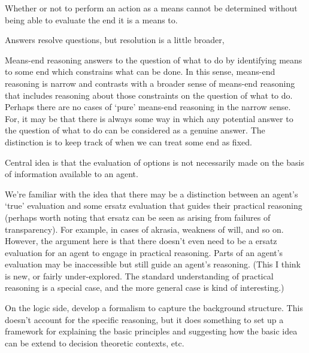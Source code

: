 \documentclass[10pt]{article}
\begin{document}
\begin{principle}
  Whether or not to perform an action as a means cannot be determined without being able to evaluate the end it is a means to.
\end{principle}

Answers resolve questions, but resolution is a little broader,













\newpage



Means-end reasoning answers to the question of what to do by identifying means to some end which constrains what can be done.
In this sense, means-end reasoning is narrow and contrasts with a broader sense of means-end reasoning that includes reasoning about those constraints on the question of what to do.
Perhaps there are no cases of `pure' means-end reasoning in the narrow sense.
For, it may be that there is always some way in which any potential answer to the question of what to do can be considered as a genuine answer.
The distinction is to keep track of when we can treat some end as fixed.













\newpage

Central idea is that the evaluation of options is not necessarily made on the basis of information available to an agent.

We're familiar with the idea that there may be a distinction between an agent's `true' evaluation and some ersatz evaluation that guides their practical reasoning (perhaps worth noting that ersatz can be seen as arising from failures of transparency).
For example, in cases of akrasia, weakness of will, and so on.
However, the argument here is that there doesn't even need to be a ersatz evaluation for an agent to engage in practical reasoning.
Parts of an agent's evaluation may be inaccessible but still guide an agent's reasoning.
{\color{red} (This I think is new, or fairly under-explored. The standard understanding of practical reasoning is a special case, and the more general case is kind of interesting.)}

On the logic side, develop a formalism to capture the background structure.
This doesn't account for the specific reasoning, but it does something to set up a framework for explaining the basic principles and suggesting how the basic idea can be extend to decision theoretic contexts, etc.
\end{document}
